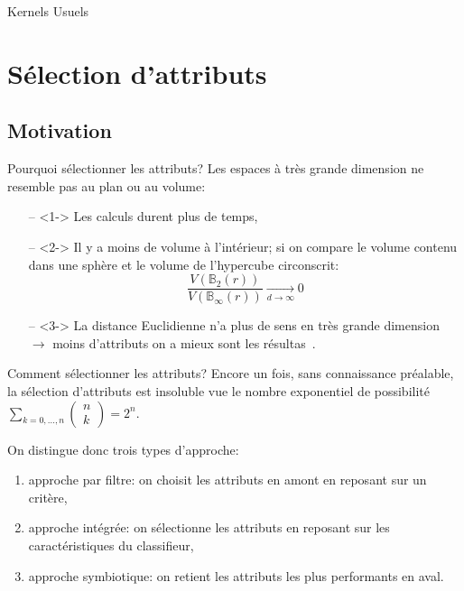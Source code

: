\documentclass[9pt]{beamer}
\begin{document}
	\begin{frame}{Kernels Usuels}

	\end{frame}

	\section[feature selection]{Sélection d'attributs}
	\subsection[motivation]{Motivation}
	\begin{frame}{Pourquoi sélectionner les attributs?}
		Les espaces à très grande dimension ne resemble pas au plan ou au volume:
		\begin{itemize}
			\item[--]<1-> Les calculs durent plus de temps,
			\item[--]<2-> Il y a moins de volume à l'intérieur; si on compare le volume contenu dans une sphère et le volume de l'hypercube circonscrit:
			$$\frac{V(\mathbb{B}_{2}(r))}{V(\mathbb{B}_{\infty}(r))}\xrightarrow[d \to \infty]{} 0$$
			\item[--]<3-> La distance Euclidienne n'a plus de sens en très grande dimension $\longrightarrow$ moins d'attributs on a mieux sont les résultas~\cite{Domingos:2012:FUT:2347736.2347755}.
		\end{itemize}
	\end{frame}

	\begin{frame}{Comment sélectionner les attributs?}
		Encore un fois, sans connaissance préalable, la sélection d'attributs est insoluble vue le nombre exponentiel de possibilité $\sum_{k=0,\dots,n} \begin{pmatrix}
		n\\
		k
		\end{pmatrix} = 2^n$.

		On distingue donc trois types d'approche:
		\begin{enumerate}
			\item<1-> approche par filtre: on choisit les attributs en amont en reposant sur un critère,
			\item<2-> approche intégrée: on sélectionne les attributs en reposant sur les caractéristiques du classifieur,
			\item<3-> approche symbiotique: on retient les attributs les plus performants en aval.
		\end{enumerate}
	\end{frame}
\end{document}
